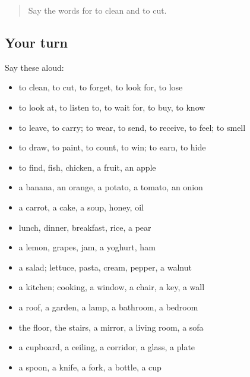 \label{lesson:FR-R77-second-pass-the-house-the-table-and-things}



\begin{quote}
Say the words for to clean and to cut.
\end{quote}

\subsection*{Your turn}
Say these aloud:

\begin{itemize}
\raggedright
  \item to clean, to cut, to forget, to look for, to lose
  \item to look at, to listen to, to wait for, to buy, to know
  \item to leave, to carry; to wear, to send, to receive, to feel; to smell
  \item to draw, to paint, to count, to win; to earn, to hide
  \item to find, fish, chicken, a fruit, an apple
  \item a banana, an orange, a potato, a tomato, an onion
  \item a carrot, a cake, a soup, honey, oil
  \item lunch, dinner, breakfast, rice, a pear
  \item a lemon, grapes, jam, a yoghurt, ham
  \item a salad; lettuce, pasta, cream, pepper, a walnut
  \item a kitchen; cooking, a window, a chair, a key, a wall
  \item a roof, a garden, a lamp, a bathroom, a bedroom
  \item the floor, the stairs, a mirror, a living room, a sofa
  \item a cupboard, a ceiling, a corridor, a glass, a plate
  \item a spoon, a knife, a fork, a bottle, a cup
\end{itemize}

